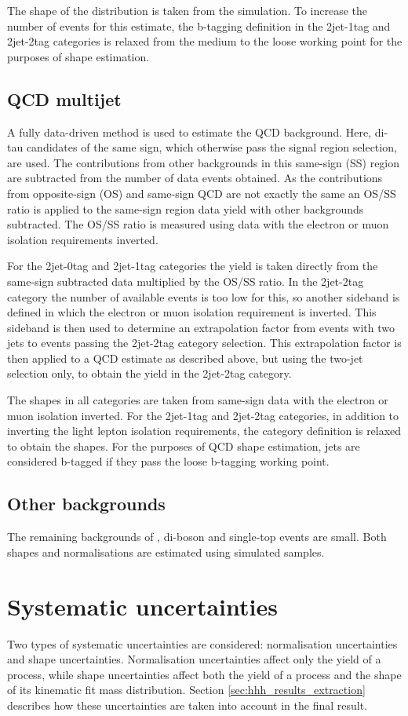 The shape of the \Wjets distribution is taken from the simulation. To 
increase the number of events for this estimate, the b-tagging definition
in the 2jet-1tag and 2jet-2tag categories is relaxed from the medium to the loose 
working point for the purposes of shape estimation.
\subsection{QCD multijet}
\label{sec:hhh_backgrounds_qcd}
A fully data-driven method is used to estimate the QCD background. Here, di-tau candidates
of the same sign, which otherwise pass the signal region selection, are used. 
The contributions from other backgrounds
in this same-sign (SS) region are subtracted from the number of data events obtained.
As the contributions from opposite-sign (OS) and same-sign QCD are
not exactly the same an OS/SS ratio is applied to the same-sign region data yield with other backgrounds subtracted.
The OS/SS ratio is measured using data with 
the electron or muon isolation requirements inverted. 

For the 2jet-0tag and 2jet-1tag categories the yield is taken directly from
the same-sign subtracted data multiplied by the OS/SS ratio. In the 2jet-2tag
category the number of available events is too low for this, so another sideband is defined
in which the electron or muon isolation requirement is inverted. This 
sideband is then used to determine an extrapolation factor from events
with two jets to events passing the 2jet-2tag category selection. This extrapolation
factor is then applied to a QCD estimate as described above, but using the two-jet 
selection only, to obtain the yield in the 2jet-2tag category.

The shapes in all categories are taken from same-sign data with the electron or muon
isolation inverted. For the 2jet-1tag and 2jet-2tag categories, in addition to 
inverting the light lepton isolation requirements, the category definition
is relaxed to obtain the shapes. For the purposes of QCD shape
estimation, jets are considered b-tagged if they pass the loose b-tagging
working point.
\subsection{Other backgrounds}
\label{sec:hhh_backgrounds_other}
The remaining backgrounds of \Zellell, di-boson and single-top
events are small. Both shapes and normalisations are
estimated using simulated samples.
 
\section{Systematic uncertainties}
\label{sec:hhh_uncs}
Two types of systematic uncertainties are considered: normalisation
uncertainties and shape uncertainties. Normalisation uncertainties affect only
the yield of a process, while shape uncertainties affect both the yield of a process and the 
shape of its kinematic fit mass distribution. 
Section \ref{sec:hhh_results_extraction}
describes how these uncertainties are taken into account in the final result.
